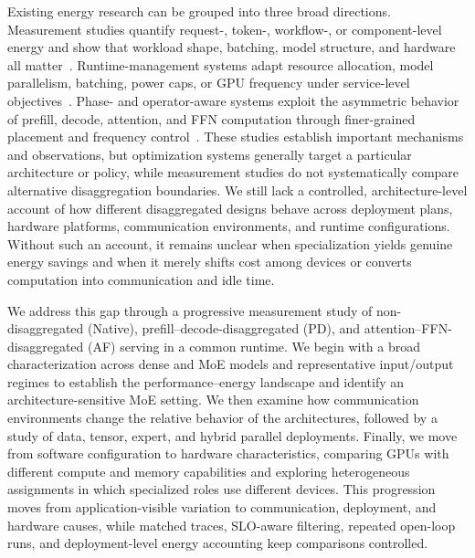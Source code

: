 Existing energy research can be grouped into three broad directions. Measurement studies quantify request-, token-, workflow-, or component-level energy and show that workload shape, batching, model structure, and hardware all matter~\cite{ifath2026characterizing,vellaisamy2026characterization,chung2025mlenergy}. Runtime-management systems adapt resource allocation, model parallelism, batching, power caps, or GPU frequency under service-level objectives~\cite{stojkovic2025dynamollm,kakolyris2025throttll,hankendi2026pals,jiang2025thunderserve,mei2025helix}. Phase- and operator-aware systems exploit the asymmetric behavior of prefill, decode, attention, and FFN computation through finer-grained placement and frequency control~\cite{liu2025greenllm,basit2026biscale,hu2026energy}. These studies establish important mechanisms and observations, but optimization systems generally target a particular architecture or policy, while measurement studies do not systematically compare alternative disaggregation boundaries. We still lack a controlled, architecture-level account of how different disaggregated designs behave across deployment plans, hardware platforms, communication environments, and runtime configurations. Without such an account, it remains unclear when specialization yields genuine energy savings and when it merely shifts cost among devices or converts computation into communication and idle time.

We address this gap through a progressive measurement study of non-disaggregated (Native), prefill--decode-disaggregated (PD), and attention--FFN-disaggregated (AF) serving in a common runtime. We begin with a broad characterization across dense and MoE models and representative input/output regimes to establish the performance--energy landscape and identify an architecture-sensitive MoE setting. We then examine how communication environments change the relative behavior of the architectures, followed by a study of data, tensor, expert, and hybrid parallel deployments. Finally, we move from software configuration to hardware characteristics, comparing GPUs with different compute and memory capabilities and exploring heterogeneous assignments in which specialized roles use different devices. This progression moves from application-visible variation to communication, deployment, and hardware causes, while matched traces, SLO-aware filtering, repeated open-loop runs, and deployment-level energy accounting keep comparisons controlled.

